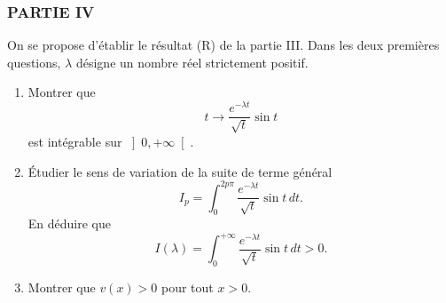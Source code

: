 \subsubsection*{PARTIE IV}

On se propose d'{\'e}tablir le r{\'e}sultat (R) de la partie III. Dans les
deux premi{\`e}res questions, $\lambda $ d{\'e}signe un nombre r{\'e}el
strictement positif.

\begin{enumerate}
\item  Montrer que
\[
t\rightarrow \frac{e^{-\lambda t}}{\sqrt{t}}\sin t
\]
est int{\'e}grable sur $\left] 0,+\infty \right[ $.

\item  {\'E}tudier le sens de variation de la suite de terme g{\'e}n{\'e}ral
\[
I_{p}=\int_{0}^{2p\pi }\frac{e^{-\lambda t}}{\sqrt{t}}\sin t\,dt\text{.}
\]
En d{\'e}duire que
\[
I(\lambda )=\int_{0}^{+\infty }\frac{e^{-\lambda t}}{\sqrt{t}}\sin t\,dt>0%
\text{.}
\]

\item  Montrer que $v(x)>0$ pour tout $x>0$.\newpage
\end{enumerate}
